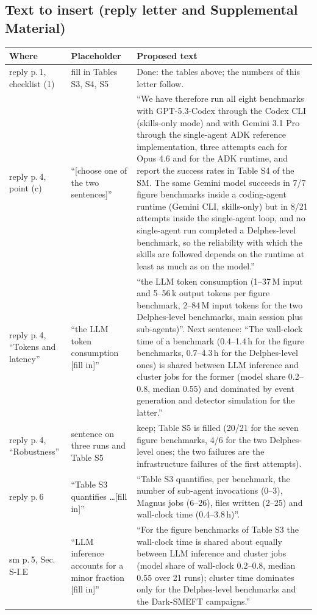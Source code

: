 \documentclass[10pt,a4paper]{article}
\begin{document}
\subsection*{Text to insert (reply letter and Supplemental Material)}
\begin{center}\small
\begin{tabular}{p{2.8cm}p{4.2cm}p{9.3cm}}
\toprule
Where & Placeholder & Proposed text \\
\midrule
reply p.\,1, checklist (1) & fill in Tables S3, S4, S5 & Done: the tables above; the numbers of this letter follow. \\
reply p.\,4, point (c) & ``[choose one of the two sentences]'' & ``We have therefore run all eight benchmarks with GPT-5.3-Codex through the Codex CLI (skills-only mode) and with Gemini 3.1 Pro through the single-agent ADK reference implementation, three attempts each for Opus 4.6 and for the ADK runtime, and report the success rates in Table S4 of the SM. The same Gemini model succeeds in 7/7 figure benchmarks inside a coding-agent runtime (Gemini CLI, skills-only) but in 8/21 attempts inside the single-agent loop, and no single-agent run completed a Delphes-level benchmark, so the reliability with which the skills are followed depends on the runtime at least as much as on the model.'' \\
reply p.\,4, ``Tokens and latency'' & ``the LLM token consumption [fill in]'' & ``the LLM token consumption (1--37\,M input and 5--56\,k output tokens per figure benchmark, 2--84\,M input tokens for the two Delphes-level benchmarks, main session plus sub-agents)''. Next sentence: ``The wall-clock time of a benchmark (0.4--1.4\,h for the figure benchmarks, 0.7--4.3\,h for the Delphes-level ones) is shared between LLM inference and cluster jobs for the former (model share 0.2--0.8, median 0.55) and dominated by event generation and detector simulation for the latter.'' \\
reply p.\,4, ``Robustness'' & sentence on three runs and Table S5 & keep; Table S5 is filled (20/21 for the seven figure benchmarks, 4/6 for the two Delphes-level ones; the two failures are the infrastructure failures of the first attempts). \\
reply p.\,6 & ``Table S3 quantifies \ldots [fill in]'' & ``Table S3 quantifies, per benchmark, the number of sub-agent invocations (0--3), Magnus jobs (6--26), files written (2--25) and wall-clock time (0.4--3.8\,h)''. \\
sm p.\,5, Sec.\,S-I.E & ``LLM inference accounts for a minor fraction [fill in]'' & ``For the figure benchmarks of Table S3 the wall-clock time is shared about equally between LLM inference and cluster jobs (model share of wall-clock 0.2--0.8, median 0.55 over 21 runs); cluster time dominates only for the Delphes-level benchmarks and the Dark-SMEFT campaigns.'' \\

\end{tabular}
\end{center}
\end{document}
